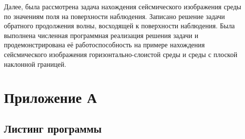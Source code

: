 \documentclass[a4paper, fontsize=14pt]{article}
\begin{document}
	Далее, была рассмотрена задача нахождения сейсмического изображения среды по значениям поля на поверхности наблюдения. Записано решение задачи обратного продолжения волны, восходящей к поверхности наблюдения. 
	Была выполнена численная программная реализация решения задачи и продемонстрирована её работоспособность на примере нахождения  сейсмического изображения горизонтально-слоистой среды и среды с плоской наклонной границей. 
	
	
	
	

	
	\newpage
	
	
	\printbibliography
	
	\newpage
	\section*{Приложение А}
	\subsection*{Листинг программы}
	
	
	
\end{document}
